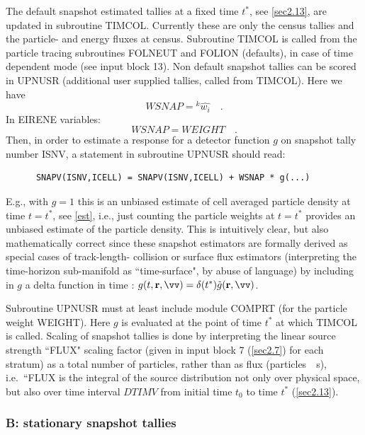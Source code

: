 The default snapshot estimated tallies at a fixed time $t^*$, see
\cref{sec2.13}, are updated in subroutine TIMCOL.
Currently these are only the census tallies and the particle- and energy fluxes
at census.
Subroutine TIMCOL is called from the particle tracing subroutines FOLNEUT and
FOLION (defaults), in case of time dependent mode (see input block 13).
Non default snapshot tallies can be scored in UPNUSR (additional user supplied
tallies, called from TIMCOL).
Here we have
\begin{displaymath}
  WSNAP = {^k{\hat{w_i}}}   \quad .
\end{displaymath}
In EIRENE variables:
\begin{displaymath}
  WSNAP = WEIGHT	\quad .
\end{displaymath}
Then, in order to estimate a response for a detector function $g$ on snapshot
tally number ISNV, a statement in subroutine UPNUSR should read:

\begin{lstlisting}
      SNAPV(ISNV,ICELL) = SNAPV(ISNV,ICELL) + WSNAP * g(...)
\end{lstlisting}

E.g., with $g=1$ this is an unbiased estimate of cell averaged particle density
at time $t=t^*$, see \cref{est}, i.e., just counting the particle weights at
$t=t^*$ provides an unbiased estimate of the particle density.
This is intuitively clear, but also mathematically correct since these snapshot
estimators are formally derived as special cases of track-length- collision or
surface flux estimators (interpreting the time-horizon sub-manifold as
``time-surface", by abuse of language) by including in $g$ a delta function in
time : $g(t,\vr,\vv)=\delta(t^*)\tilde g(\vr,\vv)$.

Subroutine UPNUSR must at least include module COMPRT (for the particle weight
WEIGHT).
Here $g$ is evaluated at the point of time $t^*$ at which TIMCOL is called.
Scaling of snapshot tallies is done by interpreting the linear source strength
``FLUX" scaling factor (given in input block 7 (\cref{sec2.7}) for each
stratum) as a total number of particles, rather than as flux
(particles~\si{\per\second}), i.e.\ ``FLUX is the integral of the source
distribution not only over physical space, but also over time interval $DTIMV$
from initial time $t_0$ to time $t^*$ (\cref{sec2.13}).

\subsubsection{B: stationary snapshot tallies}\label{sec3.2.3b}


